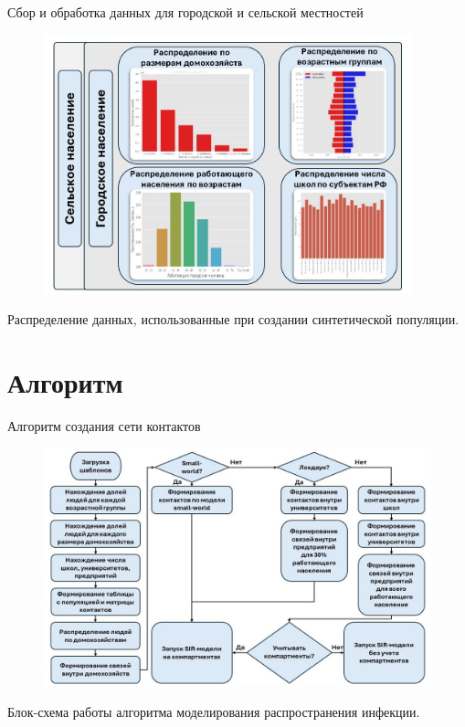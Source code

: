 \documentclass[10pt, unicode, xcolor={svgnames, table, hyperref}]{beamer}
\begin{document}
\begin{frame}[fragile,t]{Сбор и обработка данных для городской и сельской местностей}

	\begin{figure}[h!]
		\centering
		\includegraphics[width=0.95\textwidth]{img/данные.jpg}
		\label{fig:data}
	\end{figure}
	Распределение данных, использованные при создании синтетической популяции.
	
\end{frame}


\section{\small Алгоритм}

\begin{frame}[fragile,t]{Алгоритм создания сети контактов}
	\begin{figure}[h!]
		\centering
		\includegraphics[width=1.0\textwidth]{img/Алгоритм.jpg}
		\label{fig:algo}
		
	\end{figure}
Блок-схема работы алгоритма моделирования распространения инфекции.
\end{frame}
\end{document}
